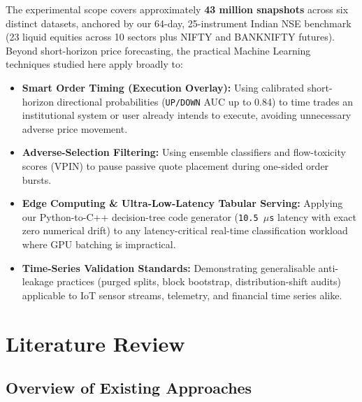 \documentclass[12pt,a4paper,oneside]{report}
\newcommand{\code}[1]{\texttt{#1}}
\begin{document}
The experimental scope covers approximately \textbf{43 million snapshots} across six distinct datasets, anchored by our 64-day, 25-instrument Indian NSE benchmark (23 liquid equities across 10 sectors plus NIFTY and BANKNIFTY futures). Beyond short-horizon price forecasting, the practical Machine Learning techniques studied here apply broadly to:
\begin{itemize}
  \item \textbf{Smart Order Timing (Execution Overlay):} Using calibrated short-horizon directional probabilities (\code{UP/DOWN} AUC up to 0.84) to time trades an institutional system or user already intends to execute, avoiding unnecessary adverse price movement.
  \item \textbf{Adverse-Selection Filtering:} Using ensemble classifiers and flow-toxicity scores (VPIN) to pause passive quote placement during one-sided order bursts.
  \item \textbf{Edge Computing \& Ultra-Low-Latency Tabular Serving:} Applying our Python-to-C++ decision-tree code generator (\code{10.5\,$\mu$s} latency with exact zero numerical drift) to any latency-critical real-time classification workload where GPU batching is impractical.
  \item \textbf{Time-Series Validation Standards:} Demonstrating generalisable anti-leakage practices (purged splits, block bootstrap, distribution-shift audits) applicable to IoT sensor streams, telemetry, and financial time series alike.
\end{itemize}

\chapter{Literature Review}

\section{Overview of Existing Approaches}
\end{document}
